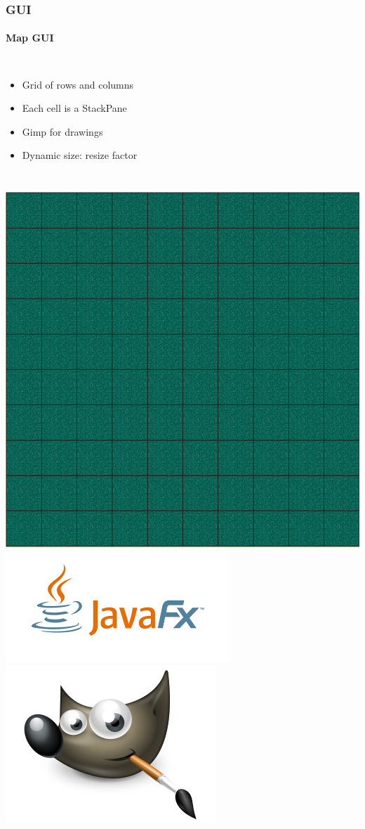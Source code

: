 \documentclass{beamer}
\begin{document}
\begin{frame}
\frametitle{GUI}
\framesubtitle{Map GUI}

\begin{columns}[T]
  \begin{itemize}
   \item Grid of rows and columns
   \item Each cell is a StackPane
   \item Gimp for drawings
   \item Dynamic size: resize factor
  \end{itemize}

 \hspace*{-5 cm}
\end{columns}
\begin{center}
 \includegraphics[scale=.2]{gridPane}
\includegraphics[scale=.2]{JavaFX}
\includegraphics[scale=.2]{gimp}
\end{center}

\end{frame}
\end{document}

